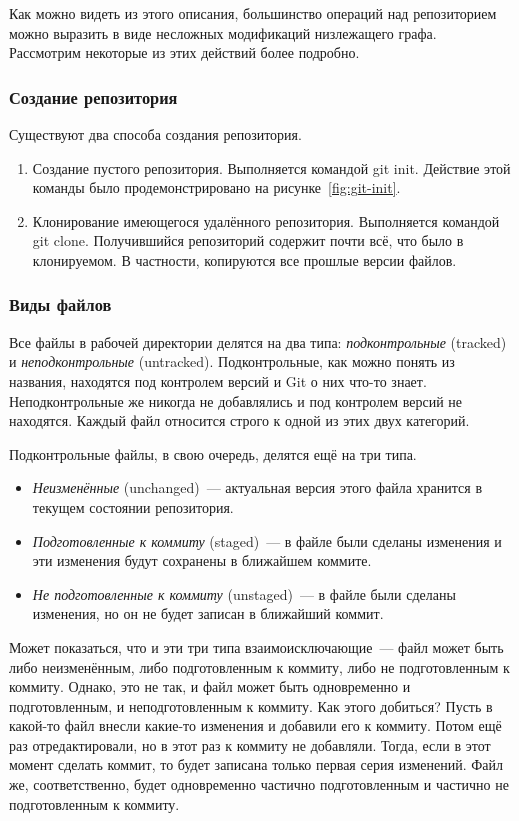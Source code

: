 Как можно видеть из этого описания, большинство операций над
репозиторием можно выразить в виде несложных модификаций низлежащего
графа. Рассмотрим некоторые из этих действий более подробно.

\subsubsection{Создание репозитория}

Существуют два способа создания репозитория.

\begin{enumerate}
\item Создание пустого репозитория. Выполняется командой git init.
  Действие этой команды было продемонстрировано на
  рисунке~\ref{fig:git-init}.
\item Клонирование имеющегося удалённого репозитория. Выполняется
  командой git clone. Получившийся репозиторий содержит почти всё, что
  было в клонируемом. В частности, копируются все прошлые версии
  файлов.
\end{enumerate}

\subsubsection{Виды файлов}

Все файлы в рабочей директории делятся на два типа:
\emph{подконтрольные} (tracked) и \emph{неподконтрольные} (untracked).
Подконтрольные, как можно понять из названия, находятся под контролем
версий и Git о них что-то знает. Неподконтрольные же никогда не
добавлялись и под контролем версий не находятся. Каждый файл относится
строго к одной из этих двух категорий.

Подконтрольные файлы, в свою очередь, делятся ещё на три типа. 

\begin{itemize}
\item \emph{Неизменённые} (unchanged)~--- актуальная версия этого
  файла хранится в текущем состоянии репозитория.
\item \emph{Подготовленные к коммиту} (staged)~--- в файле были
  сделаны изменения и эти изменения будут сохранены в ближайшем коммите.
\item \emph{Не подготовленные к коммиту} (unstaged)~--- в файле были
  сделаны изменения, но он не будет записан в ближайший коммит.
\end{itemize}

Может показаться, что и эти три типа взаимоисключающие~--- файл может
быть либо неизменённым, либо подготовленным к коммиту, либо не
подготовленным к коммиту. Однако, это не так, и файл может быть
одновременно и подготовленным, и неподготовленным к коммиту. Как этого
добиться? Пусть в какой-то файл внесли какие-то изменения и добавили
его к коммиту. Потом ещё раз отредактировали, но в этот раз к коммиту
не добавляли. Тогда, если в этот момент сделать коммит, то будет
записана только первая серия изменений. Файл же, соответственно, будет
одновременно частично подготовленным и частично не подготовленным к
коммиту.

